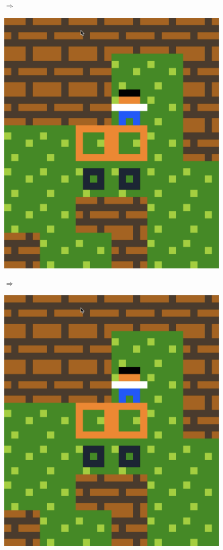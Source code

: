 \begin{figure}[!htbp]
\begin{minipage}[t]{0.2\textwidth}
\end{minipage}
$\Longrightarrow$
\begin{minipage}[t]{0.2\textwidth}
\includegraphics[width=\textwidth]{figures/maxii7.png} \hfill \\
\end{minipage}
$\Longrightarrow$
\begin{minipage}[t]{0.2\textwidth}
\includegraphics[width=\textwidth]{figures/maxii8.png} \hfill \\

\end{minipage}
\end{figure}
